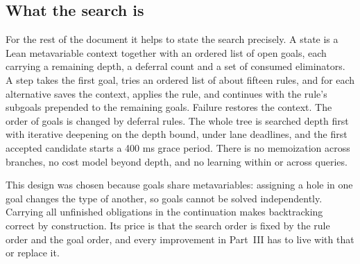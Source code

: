 \subsection{What the search is}

For the rest of the document it helps to state the search precisely. A state is a Lean metavariable context together with an ordered list of open goals, each carrying a remaining depth, a deferral count and a set of consumed eliminators. A step takes the first goal, tries an ordered list of about fifteen rules, and for each alternative saves the context, applies the rule, and continues with the rule's subgoals prepended to the remaining goals. Failure restores the context. The order of goals is changed by deferral rules. The whole tree is searched depth first with iterative deepening on the depth bound, under lane deadlines, and the first accepted candidate starts a 400 ms grace period. There is no memoization across branches, no cost model beyond depth, and no learning within or across queries.

This design was chosen because goals share metavariables: assigning a hole in one goal changes the type of another, so goals cannot be solved independently. Carrying all unfinished obligations in the continuation makes backtracking correct by construction. Its price is that the search order is fixed by the rule order and the goal order, and every improvement in Part~III has to live with that or replace it.
